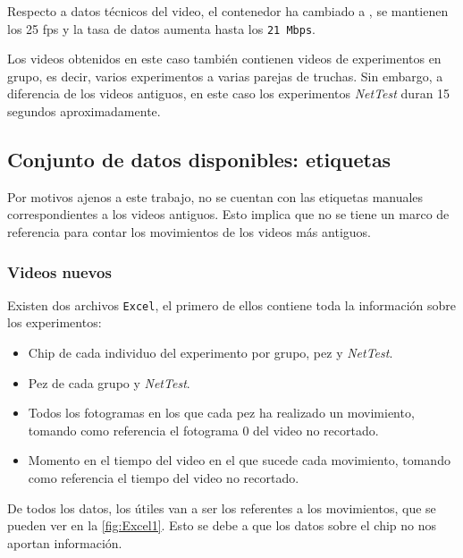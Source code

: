 Respecto a datos técnicos del video, el contenedor ha cambiado a \texttt{}, se mantienen los 25 \acrshort{fps} y la tasa de datos aumenta hasta los \texttt{21 Mbps}.

Los videos obtenidos en este caso también contienen videos de experimentos en grupo, es decir, varios experimentos a varias parejas de truchas. Sin embargo, a diferencia de los videos antiguos, 
en este caso los experimentos \textit{NetTest} duran 15 segundos aproximadamente.

\subsection{Conjunto de datos disponibles: etiquetas}

Por motivos ajenos a este trabajo, no se cuentan con las etiquetas manuales correspondientes a los videos antiguos. Esto implica que no se tiene un marco de referencia para 
contar los movimientos de los videos más antiguos.

\subsubsection*{Videos nuevos}

Existen dos archivos \texttt{Excel}, el primero de ellos contiene toda la información sobre los experimentos:
\begin{itemize}
    \item Chip de cada individuo del experimento por grupo, pez y \textit{NetTest}.
    \item Pez de cada grupo y \textit{NetTest}.
    \item Todos los fotogramas en los que cada pez ha realizado un movimiento, tomando como referencia el fotograma 0 del video no recortado.
    \item Momento en el tiempo del video en el que sucede cada movimiento, tomando como referencia el tiempo del video no recortado.
\end{itemize}

De todos los datos, los útiles van a ser los referentes a los movimientos, que se pueden ver en la \autoref{fig:Excel1}. Esto se debe a que los datos sobre el chip no nos aportan información.

